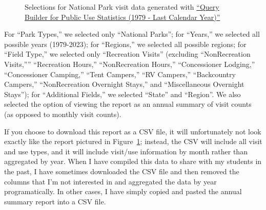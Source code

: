 \documentclass[
  letterpaper,
  DIV=11,
  numbers=noendperiod]{scrartcl}
\begin{document}
\begin{figure}


\caption{\label{fig-query-builder}Selections for National Park visit
data generated with
\href{https://irma.nps.gov/Stats/SSRSReports/National\%20Reports/Query\%20Builder\%20for\%20Public\%20Use\%20Statistics\%20(1979\%20-\%20Last\%20Calendar\%20Year)}{``Query
Builder for Public Use Statistics (1979 - Last Calendar Year)''}}

\end{figure}%

For ``Park Types,'' we selected only ``National Parks''; for ``Years,''
we selected all possible years (1979-2023); for ``Regions,'' we selected
all possible regions; for ``Field Type,'' we selected only ``Recreation
Visits'' (excluding ``NonRecreation Visits,'''' ``Recreation Hours,''
``NonRecreation Hours,'' ``Concessioner Lodging,'' ``Concessioner
Camping,'' ``Tent Campers,'' ``RV Campers,'' ``Backcountry Campers,''
``NonRecreation Overnight Stays,'' and ``Miscellaneous Overnight
Stays''); for ``Additional Fields,'' we selected ``State'' and
``Region''. We also selected the option of viewing the report as an
annual summary of visit counts (as opposed to monthly visit counts).

If you choose to download this report as a CSV file, it will
unfortunately not look exactly like the report pictured in
Figure~\ref{fig-query-builder}; instead, the CSV will include all visit
and use types, and it will include visit/use information by month rather
than aggregated by year. When I have compiled this data to share with my
students in the past, I have sometimes downloaded the CSV file and then
removed the columns that I'm not interested in and aggregated the data
by year programatically. In other cases, I have simply copied and pasted
the annual summary report into a CSV file.
\end{document}

